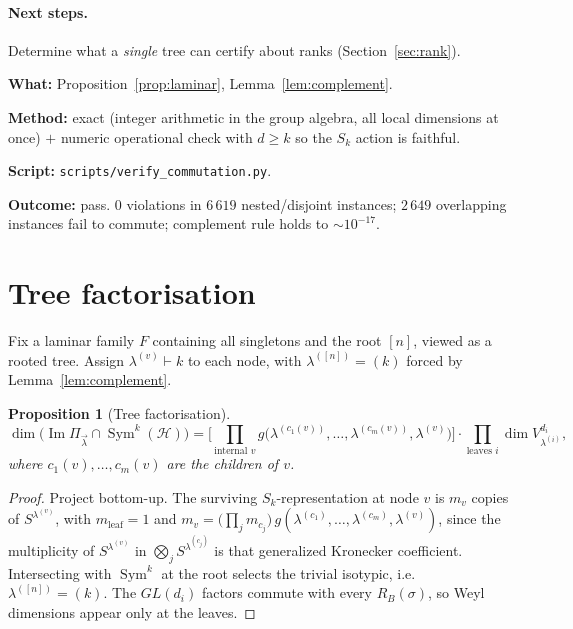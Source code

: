 \documentclass[11pt]{article}
\newtheorem{proposition}[theorem]{Proposition}
\theoremstyle{definition}
\theoremstyle{remark}
\newcommand{\bmlam}{\vec{\lambda}}
\newcommand{\Sym}{\operatorname{Sym}}
\newcommand{\Imm}{\operatorname{Im}}
\newcommand{\Hil}{\mathcal{H}}
\begin{document}
\paragraph{Next steps.}
Determine what a \emph{single} tree can certify about ranks (Section~\ref{sec:rank}).

\begin{verification}
\textbf{What:} Proposition~\ref{prop:laminar}, Lemma~\ref{lem:complement}.

\textbf{Method:} exact (integer arithmetic in the group algebra, all local dimensions
at once) $+$ numeric operational check with $d \ge k$ so the $S_k$ action is faithful.

\textbf{Script:} \texttt{scripts/verify\_commutation.py}.

\textbf{Outcome:} pass. 0 violations in $6\,619$ nested/disjoint instances;
$2\,649$ overlapping instances fail to commute; complement rule holds to
$\sim 10^{-17}$.
\end{verification}

\section{Tree factorisation}
\label{sec:tree}

Fix a laminar family $F$ containing all singletons and the root $[n]$, viewed as a
rooted tree. Assign $\lambda^{(v)} \vdash k$ to each node, with $\lambda^{([n])} = (k)$
forced by Lemma~\ref{lem:complement}.

\begin{proposition}[Tree factorisation]
\label{prop:tree}
\[
  \dim\bigl( \Imm \Pi_{\bmlam} \cap \Sym^k(\Hil) \bigr)
   = \Biggl[ \prod_{\text{internal } v}
       g\bigl(\lambda^{(c_1(v))},\dots,\lambda^{(c_m(v))}, \lambda^{(v)}\bigr) \Biggr]
     \cdot \prod_{\text{leaves } i} \dim V^{d_i}_{\lambda^{(i)}},
\]
where $c_1(v),\dots,c_m(v)$ are the children of $v$.
\end{proposition}

\begin{proof}
Project bottom-up. The surviving $S_k$-representation at node $v$ is $m_v$ copies of
$S^{\lambda^{(v)}}$, with $m_{\text{leaf}} = 1$ and
$m_v = \bigl(\prod_j m_{c_j}\bigr)\, g(\lambda^{(c_1)},\dots,\lambda^{(c_m)},\lambda^{(v)})$,
since the multiplicity of $S^{\lambda^{(v)}}$ in $\bigotimes_j S^{\lambda^{(c_j)}}$ is
that generalized Kronecker coefficient. Intersecting with $\Sym^k$ at the root selects
the trivial isotypic, i.e.\ $\lambda^{([n])} = (k)$. The $GL(d_i)$ factors commute with
every $R_B(\sigma)$, so Weyl dimensions appear only at the leaves.
\end{proof}
\end{document}
